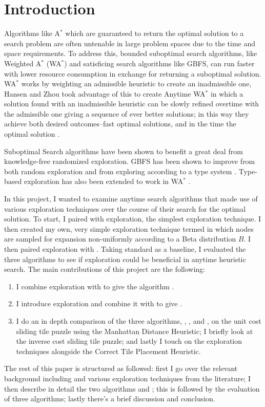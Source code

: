 \section{Introduction}
Algorithms like A$^*$ which are guaranteed to return the optimal solution to a search problem are often untenable in large problem spaces due to the time and space requirements. To address this, bounded suboptimal search algorithms, like Weighted A$^*$ (WA$^*$) and satisficing search algorithms like GBFS, can run faster with lower resource consumption in exchange for returning a suboptimal solution. WA$^*$ works by weighting an admissible heuristic to create an inadmissible one, Hansen and Zhou took advantage of this to create Anytime WA$^*$ in which a solution found with an inadmissible heuristic can be slowly refined overtime with the admissible one giving a sequence of ever better solutions; in this way they achieve both desired outcomes--fast optimal solutions, and in the time the optimal solution \cite{hansen2007anytime}.  

Suboptimal Search algorithms have been shown to benefit a great deal from knowledge-free randomized exploration. GBFS has been shown to improve from both random exploration and from exploring according to a type system \cite{valenzano2014comparison}\cite{xie2014type}. Type-based exploration has also been extended to work in WA$^*$ \cite{cohen2021type}.

In this project, I wanted to examine anytime search algorithms that made use of various exploration techniques over the course of their search for the optimal solution. To start, I paired \awa with \egreedy exploration, the simplest exploration technique. I then created my own, very simple exploration technique termed \ebgreedy in which nodes are sampled for expansion non-uniformly according to a Beta distribution $B$. I then paired \ebgreedy exploration with \awa. Taking standard \awa as a baseline, I evaluated the three algorithms to see if exploration could be beneficial in anytime heuristic search. The main contributions of this project are the following:
\begin{enumerate}
    \item I combine \egreedy exploration with \awa to give the algorithm \eawa.
    \item I introduce \ebgreedy exploration and combine it with \awa to give \ebawa.
    \item I do an in depth comparison of the three algorithms, \awa, \eawa, and \ebawa, on the unit cost sliding tile puzzle using the Manhattan Distance Heuristic; I briefly look at the inverse cost sliding tile puzzle; and lastly I touch on the exploration techniques alongside the Correct Tile Placement Heuristic. 
\end{enumerate}

The rest of this paper is structured as followed: first I go over the relevant background including \awa and various exploration techniques from the literature; I then describe in detail the two algorithms \eawa and \ebawa; this is followed by the evaluation of three algorithms; lastly there's a brief discussion and conclusion.

